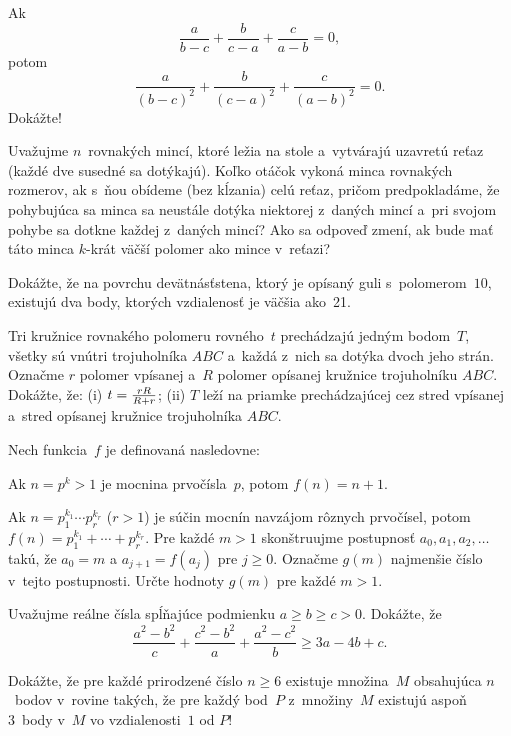 {%
Ak
$$
\frac a{b-c}+\frac b{c-a}+\frac c{a-b}=0,
$$
potom
$$
\frac a{(b-c)^2}+\frac b{(c-a)^2}+\frac c{(a-b)^2}=0.
$$
Dokážte!}

{%
Uvažujme $n$~rovnakých mincí, ktoré ležia na stole
a~vytvárajú uzavretú reťaz (každé dve susedné
sa dotýkajú). Koľko otáčok vykoná minca
rovnakých rozmerov, ak s~ňou obídeme (bez kĺzania)
celú reťaz, pričom predpokladáme, že pohybujúca
sa minca sa neustále dotýka niektorej z~daných mincí a~pri
svojom pohybe sa dotkne každej z~daných mincí? Ako sa odpoveď
zmení, ak bude mať táto minca $k$-krát väčší polomer ako mince v~reťazi?}

{%
Dokážte, že na povrchu devätnásťstena,
ktorý je opísaný guli s~polomerom~$10$, existujú dva body,
ktorých vzdialenosť je väčšia ako~21.}

{%
Tri kružnice rovnakého polomeru rovného~$t$ prechádzajú jedným bodom~$T$,
všetky sú vnútri trojuholníka $ABC$ a~každá z~nich sa dotýka dvoch jeho strán.
Označme $r$ polomer vpísanej a~$R$ polomer opísanej kružnice trojuholníku $ABC$.
Dokážte, že:
\ite (i) $t={rR\over R+r}$;
\ite (ii) $T$ leží na priamke prechádzajúcej cez stred vpísanej a~stred
opísanej kružnice trojuholníka $ABC$.}

{%
Nech funkcia~$f$ je definovaná nasledovne:
\item Ak $n=p^k > 1$ je mocnina prvočísla~$p$, potom $f(n) =
  n+1$.
\item Ak $n=p_1^{k_1}\cdots p_r^{k_r}$ ($r>1$) je súčin mocnín navzájom
rôznych prvočísel, potom $f(n) = p_1^{k_1} + \cdots +
p_r^{k_r}$.
Pre každé $m>1$ skonštruujme postupnosť $a_0, a_1, a_2, \dots$ takú, že
$a_0=m$ a $a_{j+1} = f(a_j)$ pre $j\geq0$. Označme $g(m)$ najmenšie číslo v~tejto
postupnosti. Určte hodnoty $g(m)$ pre každé $m>1$.}

{%
Uvažujme reálne čísla spĺňajúce podmienku $a\ge b\ge c>0$. Dokážte, že
$$
  \frac{a^2-b^2}c + \frac{c^2-b^2}a + \frac{a^2-c^2}b \ge 3a - 4b +c.
$$}

{%
Dokážte, že pre každé prirodzené číslo $n\ge 6$ existuje množina~$M$
obsahujúca $n$~bodov v~rovine takých, že pre každý bod~$P$ z~množiny~$M$
existujú aspoň 3~body v~$M$ vo vzdialenosti~$1$ od $P$!}

